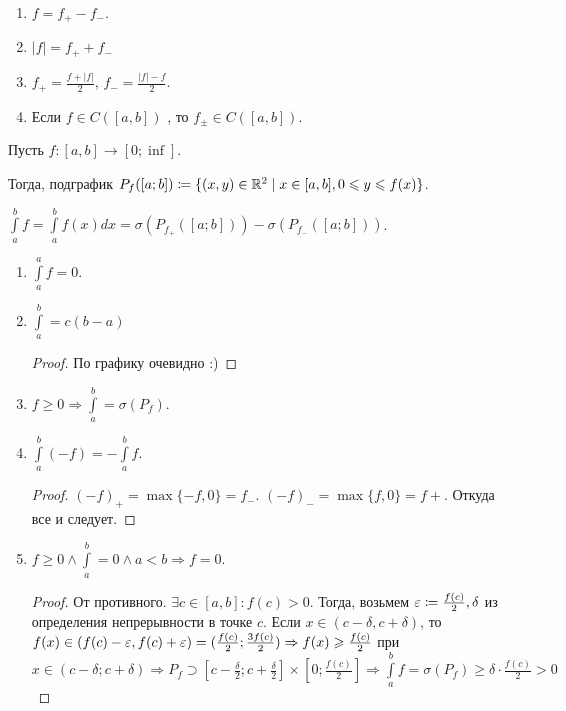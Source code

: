 \begin{properties}
    \begin{enumerate}
        \item $f = f_+ - f_-$.
        \item  $|f| = f_+ + f_-$
        \item  $f_+ = \frac{f + |f|}{2}$, $f_- = \frac{|f| - f}{2}$.
        \item Если $f \in C([a, b])$ , то  $f_{\pm} \in C([a, b])$.
    \end{enumerate}
\end{properties}

\begin{definition}
    Пусть $f\!: [a, b] \to [0; \inf]$.

    Тогда, подграфик $P_f([a; b]) \coloneqq \{(x, y) \in \mathbb{R}^2 \mid x \in [a, b], 0 \leqslant y \leqslant f(x)\}$.
\end{definition}
\begin{definition}
    $\int\limits_a^b f = \int\limits_a^b f(x) dx = \sigma(P_{f_+}([a; b])) - \sigma(P_{f_-}([a; b]))$.
\end{definition}
\begin{properties}
    \begin{enumerate}
        \item $\int\limits_a^a f = 0$.
        \item $\int\limits_a^b = c(b-a)$
            \begin{proof}
                По графику очевидно :)
            \end{proof}
        \item $f \ge 0 \Rightarrow \int\limits_a^b = \sigma(P_f)$.
        \item $\int\limits_a^b (-f) = -\int\limits_a^b f$.
             \begin{proof}
                 $(-f)_+ = \max\{-f, 0\} = f_-$.  $(-f)_- = \max\{f, 0\} = f+$.  Откуда все и следует.
            \end{proof}
        \item $f \ge 0 \land \int\limits_a^b = 0 \land a < b \Rightarrow f = 0$.
            \begin{proof}
                От противного. $\exists c \in [a, b]\!: f(c) > 0$. Тогда, возьмем $\varepsilon \coloneqq \frac{f(c)}{2}, \delta$ из определения непрерывности в точке $c$. Если  $x \in (c - \delta, c + \delta)$, то  $f(x) \in (f(c) - \varepsilon, f(c) + \varepsilon) = (\frac{f(c)}{2}; \frac{3f(c)}{2}) \Rightarrow f(x) \geqslant \frac{f(c)}{2}$ при $x \in (c - \delta; c + \delta) \Rightarrow P_f \supset [c-\frac{\delta}{2}; c + \frac{\delta}{2}]\times[0; \frac{f(c)}{2}] \Rightarrow \int\limits_a^b f = \sigma(P_f) \ge \delta \cdot \frac{f(c)}{2} > 0$
            \end{proof}
    \end{enumerate}
\end{properties}
